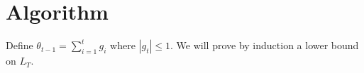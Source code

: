 \section{Algorithm}
Define $\theta_{t-1}=\sum_{i=1}^t g_i$ where $|g_t|\leq 1$.
We will prove by induction a lower bound on $L_T$.

% 
% 
